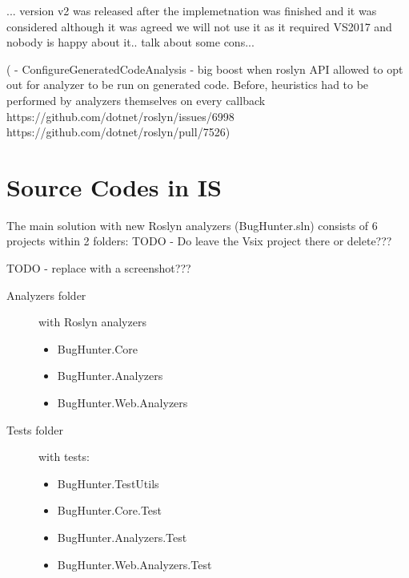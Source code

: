 \documentclass[
  digital, %
  table,   %
  lof,     %
  lot,     %
  oneside,
]{fithesis3}
\begin{document}
... version v2 was released after the implemetnation was finished and it was considered although it was agreed we will not use it as it required VS2017 and nobody is happy about it.. talk about some cons...

(  - ConfigureGeneratedCodeAnalysis - big boost when roslyn API allowed to opt out for analyzer to be run on generated code. Before, heuristics had to be performed by analyzers themselves on every callback
   https://github.com/dotnet/roslyn/issues/6998
   https://github.com/dotnet/roslyn/pull/7526)



	\makeatletter\thesis@blocks@clear\makeatother

	\printindex
    
  \printbibliography

	\appendix %
  \chapter{Source Codes in IS}
  The main solution with new Roslyn analyzers (BugHunter.sln) consists of 6 projects within 2 folders: TODO - Do leave the Vsix project there or delete???

TODO - replace with a screenshot???
\begin{description}
  \item[Analyzers folder] with Roslyn analyzers
  \begin{itemize}
    \item BugHunter.Core
    \item BugHunter.Analyzers
    \item BugHunter.Web.Analyzers
  \end{itemize}
  
  \item[Tests folder] with tests:
  \begin{itemize}
    \item BugHunter.TestUtils
    \item BugHunter.Core.Test
    \item BugHunter.Analyzers.Test
    \item BugHunter.Web.Analyzers.Test
  \end{itemize}
\end{description}
\end{document}
